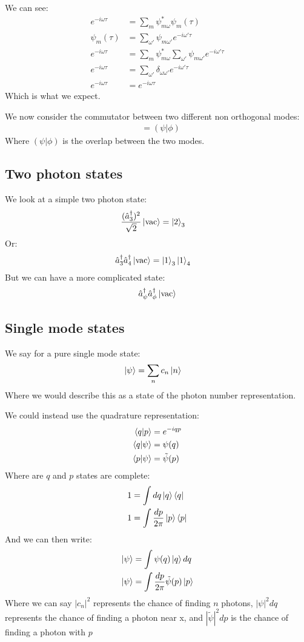 We can see:
\begin{align*}
	e^{-i\omega\tau} &= \sum_m \psi_{m\omega}^* \psi_m(\tau) \\
	\psi_m(\tau) &= \sum_{\omega'} \psi_{m\omega'} e^{-i\omega'\tau} \\
	e^{-i\omega\tau} &= \sum_m \psi_{m\omega}^* \sum_{\omega'} \psi_{m\omega'} e^{-i\omega'\tau} \\
	e^{-i\omega\tau} &= \sum_{\omega'}\delta_{\omega\omega'} e^{-i\omega'\tau} \\
	e^{-i\omega\tau} &= e^{-i\omega\tau}
\end{align*}
Which is what we expect. 

We now consider the commutator between two different non orthogonal modes:
\begin{align*}
	[\hat{a}_\psi, \hat{a}^\dagger_\phi] &= (\psi|\phi)
\end{align*}
Where $(\psi|\phi)$ is the overlap between the two modes.
\subsection{Two photon states}
We look at a simple two photon state:
\begin{align*}
	\frac{(\hat{a}_3^\dagger)^2}{\sqrt{2}}\ket{\text{vac}} &= \ket{2}_3
\end{align*}
Or:
\begin{align*}
	\hat{a}_3^\dagger \hat{a}_4^\dagger \ket{\text{vac}} &= \ket{1}_3\ket{1}_4
\end{align*}
But we can have a more complicated state:
\begin{align*}
	\hat{a}_\psi^\dagger\hat{a}_\phi^\dagger\ket{\text{vac}}
\end{align*}
\subsection{Single mode states}
We say for a pure single mode state:
\begin{align*}
	\ket{\psi} &= \sum_n c_n \ket{n}
\end{align*}
Where we would describe this as a state of the photon number representation.

We could instead use the quadrature representation:
\begin{align*}
	\bra{q}\ket{p} &= e^{-iqp} \\
	\bra{q}\ket{\psi} &= \psi(q) \\
	\bra{p}\ket{\psi} &= \tilde{\psi}(p)
\end{align*}
Where are $q$ and $p$ states are complete:
\begin{align*}
	1 &= \int dq \ket{q}\bra{q} \\
	1 &= \int \frac{dp}{2\pi} \ket{p}\bra{p}
\end{align*}
And we can then write:
\begin{align*}
	\ket{\psi} &= \int \psi(q) \ket{q} dq \\
	\ket{\psi} &= \int \frac{dp}{2\pi} \tilde{\psi}(p) \ket{p}
\end{align*}
Where we can say $|c_n|^2$ represents the chance of finding $n$ photons, $|\psi|^2 dq$ represents the chance of finding a photon near x, and $|\tilde{\psi}|^2 dp$ is the chance of finding a photon with $p$

